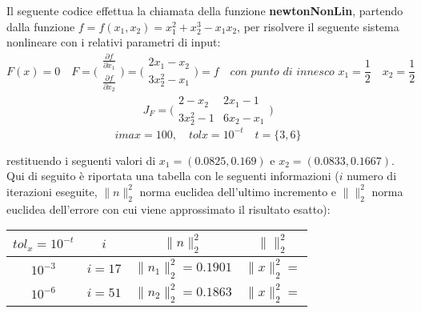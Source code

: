 Il seguente codice effettua la chiamata della funzione \textbf{newtonNonLin}, partendo dalla funzione 
$f = f(x_1,x_2)=x_1^2+x_2^3-x_1x_2$, per risolvere il seguente sistema nonlineare con i relativi parametri di input:
	\[
	F(x)=0 \quad
	F=\Bigg(\begin{matrix}
		\frac{\partial f}{\partial x_1} \\
		\frac{\partial f}{\partial x_2} 
	\end{matrix}\Bigg) = 
	\Bigg(\begin{matrix}
		2x_1-x_2 \\
		3x_2^2-x_1
	\end{matrix}\Bigg)=f \quad
	\textit{con punto di innesco } x_1=\frac{1}{2} \quad x_2=\frac{1}{2}
	\]
	\[
	J_F=\Bigg(\begin{matrix}
		2-x_2 & 2x_1-1 \\
		3x_2^2-1 & 6x_2-x_1 
	\end{matrix}\Bigg)
	\]
	\[
	imax=100, \quad 
	tolx=10^{-t} \quad t=\{3,6\}
	\]

restituendo i seguenti valori di $x_1 = (0.0825 , 0.169)$ e $x_2 = (0.0833 , 0.1667)$.
Qui di seguito è riportata una tabella con le seguenti informazioni ($i$ numero di iterazioni eseguite, $\|n\|^2_2$ norma euclidea dell'ultimo incremento e $\|\|^2_2$ norma euclidea dell'errore con cui viene approssimato il risultato esatto):
\begin{center}
	\begin{tabular}{|c|c|c|c|}
		\hline
			$tol_x=10^{-t}$ & $i$ & $\|n\|^2_2$ & $\|\|^2_2$ \\
		\hline
    		$10^{-3}$ & $i = 17$ & $\|n_1\|^2_2 = 0.1901$ & $\|x\|^2_2 = $ \\
    		$10^{-6}$ & $i = 51$ & $\|n_2\|^2_2 = 0.1863$ & $\|x\|^2_2 = $ \\
		\hline
	\end{tabular}
\end{center}